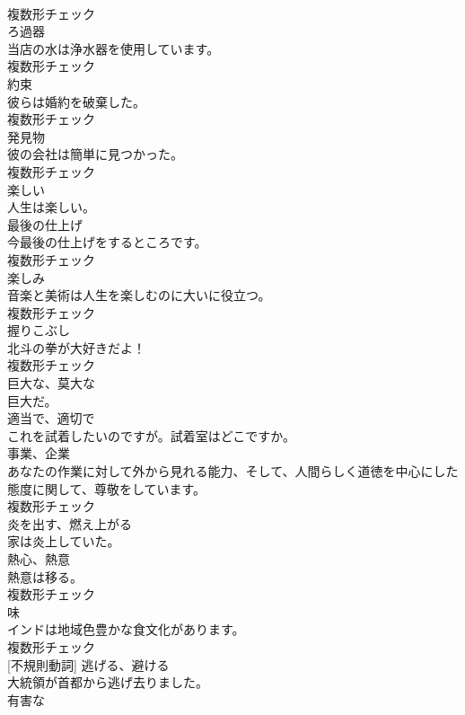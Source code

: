 \documentclass[8pt]{extreport}
\begin{document}
\begin{CJK}{UTF8}{min}
\\	複数形チェック
\\	[名詞]	ろ過器	
\\	当店の水は浄水器を使用しています。	
\\	複数形チェック
\\	[名詞]	約束	
\\	彼らは婚約を破棄した。	
\\	複数形チェック
\\	[名詞]	発見物	
\\	彼の会社は簡単に見つかった。	
\\	複数形チェック
\\	[形容詞]	楽しい	
\\	人生は楽しい。	
\\	[名詞]	最後の仕上げ	
\\	今最後の仕上げをするところです。	
\\	複数形チェック
\\	[名詞]	楽しみ	
\\	音楽と美術は人生を楽しむのに大いに役立つ。	
\\	複数形チェック
\\	[名詞]	握りこぶし	
\\	北斗の拳が大好きだよ！	
\\	複数形チェック
\\	[形容詞]	巨大な、莫大な	
\\	巨大だ。	
\\	[形容詞]	適当で、適切で	
\\	これを試着したいのですが。試着室はどこですか。	
\\	[名詞]	事業、企業	
\\	あなたの作業に対して外から見れる能力、そして、人間らしく道徳を中心にした態度に関して、尊敬をしています。	
\\	複数形チェック
\\	[動詞]	炎を出す、燃え上がる	
\\	家は炎上していた。	
\\	[名詞]	熱心、熱意	
\\	熱意は移る。	
\\	複数形チェック
\\	[名詞]	味	
\\	インドは地域色豊かな食文化があります。	
\\	複数形チェック
\\	[動詞] [不規則動詞]	逃げる、避ける	
\\	大統領が首都から逃げ去りました。	
\\	[形容詞]	有害な	

\end{CJK}
\end{document}
